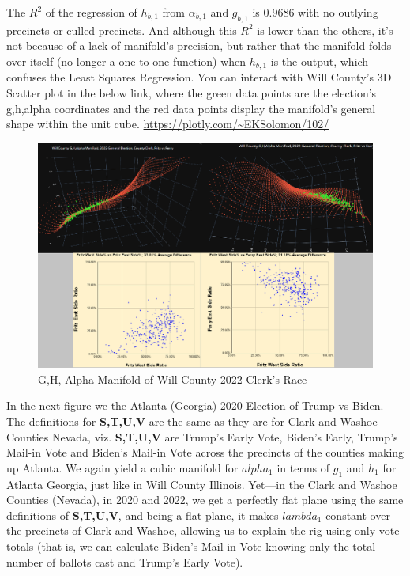 \documentclass[preprint,13pt]{elsarticle}
\begin{document}
The $R^2$ of the regression of $h_{b,1}$ from $\alpha_{b,1}$ and $g_{b,1}$ is 0.9686 with no outlying precincts or culled precincts. And although this $R^2$ is lower than the others, it's not because of a lack of manifold's precision, but rather that the manifold folds over itself (no longer a one-to-one function) when $h_{b,1}$ is the output, which confuses the Least Squares Regression. 
You can interact with Will County's 3D Scatter plot in the below link, where the green data points are the election's g,h,alpha coordinates and the red data points display the manifold's general shape within the unit cube. \url{https://plotly.com/~EKSolomon/102/}
\begin{figure}[bp!]
\begin{center}
\caption{G,H, Alpha Manifold of Will County 2022 Clerk's Race}
\includegraphics[width=400pt]{will county latex.png}
\end{center}
\end{figure}
\newpage
In the next figure we the Atlanta (Georgia) 2020 Election of Trump vs Biden. The definitions for \textbf{S,T,U,V} are the same as they are for Clark and Washoe Counties Nevada, viz. \textbf{S,T,U,V} are Trump's Early Vote, Biden's Early, Trump's Mail-in Vote and Biden's Mail-in Vote across the precincts of the counties making up Atlanta. We again yield a cubic manifold for $alpha_{1}$ in terms of $g_{1}$ and $h_{1}$ for Atlanta Georgia, just like in Will County Illinois. Yet---in the Clark and Washoe Counties (Nevada), in 2020 and 2022, we get a perfectly flat plane using the same definitions of \textbf{S,T,U,V}, and being a flat plane, it makes $lambda_{1}$ constant over the precincts of Clark and Washoe, allowing us to explain the rig using only vote totals (that is, we can calculate Biden's Mail-in Vote knowing only the total number of ballots cast and Trump's Early Vote).
\end{document}
